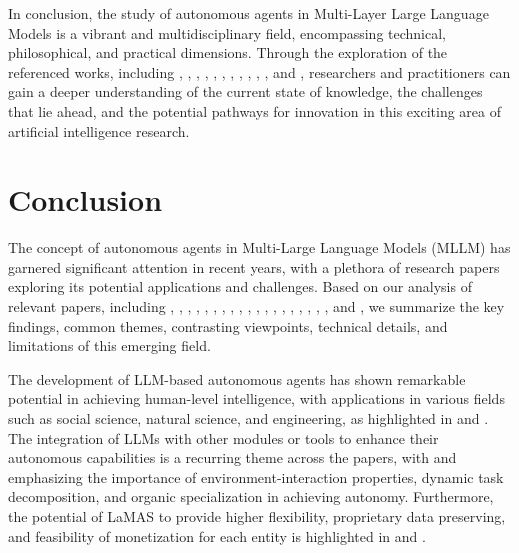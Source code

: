 \documentclass[conference]{IEEEtran}
\begin{document}
In conclusion, the study of autonomous agents in Multi-Layer Large Language Models is a vibrant and multidisciplinary field, encompassing technical, philosophical, and practical dimensions. Through the exploration of the referenced works, including \cite{2411.14033}, \cite{2308.11432}, \cite{2402.02716}, \cite{2310.08535}, \cite{2407.10735}, \cite{2308.05960}, \cite{2309.07870}, \cite{2409.14457}, \cite{2404.13501}, \cite{2403.11381}, \cite{2407.16190}, and \cite{2412.04093}, researchers and practitioners can gain a deeper understanding of the current state of knowledge, the challenges that lie ahead, and the potential pathways for innovation in this exciting area of artificial intelligence research.

\section{Conclusion}
The concept of autonomous agents in Multi-Large Language Models (MLLM) has garnered significant attention in recent years, with a plethora of research papers exploring its potential applications and challenges. Based on our analysis of relevant papers, including \cite{2411.14033}, \cite{2308.11432}, \cite{2402.02716}, \cite{2407.16190}, \cite{2407.10735}, \cite{2407.01489}, \cite{2404.13501}, \cite{2012.12600}, \cite{2310.08535}, \cite{2405.06643}, \cite{2308.05960}, \cite{2409.14457}, \cite{2402.01680}, \cite{2309.07870}, \cite{2405.02957}, \cite{2405.11106}, \cite{2403.11381}, \cite{2412.04093}, \cite{2412.03359}, and \cite{2407.07086}, we summarize the key findings, common themes, contrasting viewpoints, technical details, and limitations of this emerging field.

The development of LLM-based autonomous agents has shown remarkable potential in achieving human-level intelligence, with applications in various fields such as social science, natural science, and engineering, as highlighted in \cite{2411.14033} and \cite{2308.11432}. The integration of LLMs with other modules or tools to enhance their autonomous capabilities is a recurring theme across the papers, with \cite{2402.02716} and \cite{2407.16190} emphasizing the importance of environment-interaction properties, dynamic task decomposition, and organic specialization in achieving autonomy. Furthermore, the potential of LaMAS to provide higher flexibility, proprietary data preserving, and feasibility of monetization for each entity is highlighted in \cite{2409.14457} and \cite{2308.05960}.
\end{document}

